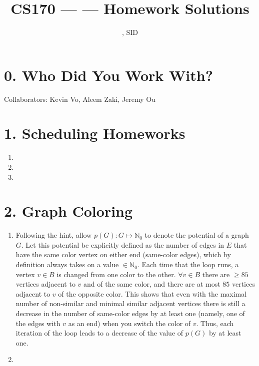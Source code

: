 \documentclass[11pt]{article}
\title{CS170 --- \Session --- Homework \Homework \space Solutions}
\author{\Name, SID \SID}
\date{}
\begin{document}
\maketitle

\section*{0. Who Did You Work With?}

Collaborators: Kevin Vo, Aleem Zaki, Jeremy Ou



\newpage
\section*{1. Scheduling Homeworks}
\begin{enumerate}[label=(\alph*)]
\item


\item


\item


\end{enumerate}


\newpage
\section*{2.  Graph Coloring}
\begin{enumerate}[label=(\alph*)]
\item
Following the hint, allow $p(G):G\mapsto\mathbb{N}_0$ to denote the potential of a graph $G$. Let this potential be explicitly defined as the number of edges in $E$ that have the same color vertex on either end (same-color edges), which by definition always takes on a value $\in \mathbb{N}_0$. Each time that the loop runs, a vertex $v\in B$ is changed from one color to the other.  $\forall v \in B$ there are $\geq 85$ vertices adjacent to $v$ and of the same color, and there are at most $85$ vertices adjacent to $v$ of the opposite color. This shows that even with the maximal number of non-similar and minimal similar adjacent vertices there is still a decrease in the number of same-color edges  by at least one (namely, one of the edges with $v$ as an end) when you switch the color of $v$. Thus, each iteration of the loop leads to a decrease of the value of $p(G)$ by at least one.

\item


\end{enumerate}
\end{document}
